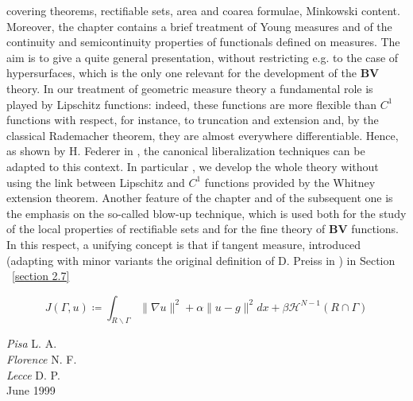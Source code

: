 covering theorems, rectifiable sets, area and coarea formulae, Minkowski content. Moreover, the chapter contains a brief treatment of Young 
measures and of the continuity and semicontinuity properties of functionals defined on measures. The aim is to give a quite general 
presentation, without restricting e.g. to the case of hypersurfaces, which is the only one relevant for the development of the $\mathbf{BV}$ 
theory. In our treatment of geometric measure theory a fundamental role is played by Lipschitz functions: indeed, these functions are more 
flexible than $\mathit{C}^1$ functions with respect, for instance, to truncation and extension and, by the classical Rademacher theorem,
they are almost everywhere differentiable. Hence, as shown by H. Federer in \cite{152}, the canonical liberalization techniques 
can be adapted to this context. In particular , we develop the whole theory without using the link between Lipschitz and $\mathit{C}^1$ 
functions provided by the Whitney extension theorem. Another feature of the chapter and of the subsequent one is the emphasis on the 
so-called blow-up technique, which is used both for the study of the local properties of rectifiable sets and for the fine theory of $\mathbf{BV}$ 
functions. In this respect, a unifying concept is that if tangent measure, introduced (adapting with minor variants the original definition of
D. Preiss in \cite{242}) in Section ~\ref{section 2.7}  


\begin{equation}
  J(\Gamma, u)\coloneqq \int_{R\backslash \Gamma}^{}\|\nabla u\|^2 +\alpha\|u-g\|^2 dx + \beta \mathcal{H}^{N-1} (R\cap \Gamma)
\end{equation}



\vspace{\baselineskip}

\noindent \textit{Pisa} \hfill L. A.\\
\textit{Florence} \hfill N. F.\\
\textit{Lecce} \hfill D. P.\\
June 1999\\

